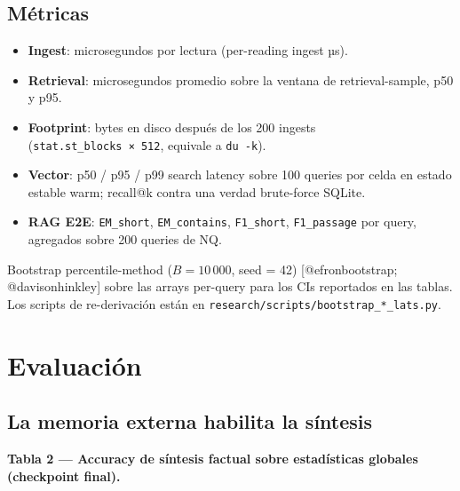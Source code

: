 \subsection{Métricas}\label{muxe9tricas}

\begin{itemize}
\tightlist
\item
  \textbf{Ingest}: microsegundos por lectura (per-reading ingest µs).
\item
  \textbf{Retrieval}: microsegundos promedio sobre la ventana de
  retrieval-sample, p50 y p95.
\item
  \textbf{Footprint}: bytes en disco después de los 200 ingests
  (\texttt{stat.st\_blocks\ ×\ 512}, equivale a \texttt{du\ -k}).
\item
  \textbf{Vector}: p50 / p95 / p99 search latency sobre 100 queries por celda en
  estado estable warm; recall@k contra una verdad brute-force SQLite.
\item
  \textbf{RAG E2E}: \texttt{EM\_short}, \texttt{EM\_contains},
  \texttt{F1\_short}, \texttt{F1\_passage} por query, agregados sobre 200
  queries de NQ.
\end{itemize}

Bootstrap percentile-method (\(B = 10\,000\), seed = 42) {[}@efronbootstrap;
@davisonhinkley{]} sobre las arrays per-query para los CIs reportados en las
tablas. Los scripts de re-derivación están en
\texttt{research/scripts/bootstrap\_*\_lats.py}.

\section{Evaluación}\label{evaluaciuxf3n}

\subsection{La memoria externa habilita la
síntesis}\label{la-memoria-externa-habilita-la-suxedntesis}

\textbf{Tabla 2 --- Accuracy de síntesis factual sobre estadísticas globales
(checkpoint final).}

